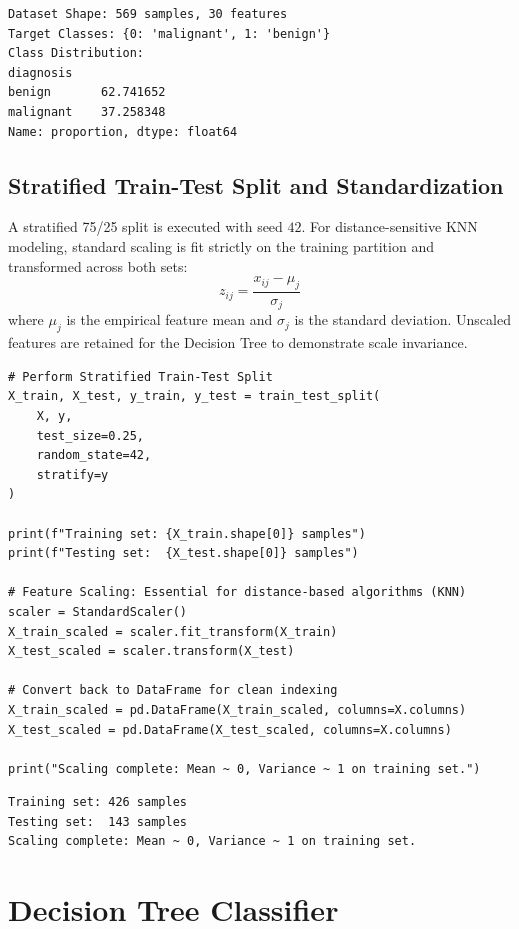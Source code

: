\documentclass[12pt]{article}
\begin{document}
\begin{lstlisting}[style=output]
Dataset Shape: 569 samples, 30 features
Target Classes: {0: 'malignant', 1: 'benign'}
Class Distribution:
diagnosis
benign       62.741652
malignant    37.258348
Name: proportion, dtype: float64
\end{lstlisting}

\subsection{Stratified Train-Test Split and Standardization}
A stratified 75/25 split is executed with seed $42$. For distance-sensitive KNN modeling, standard scaling is fit strictly on the training partition and transformed across both sets:
\begin{equation}
    z_{ij} = \frac{x_{ij} - \mu_j}{\sigma_j}
\end{equation}
where $\mu_j$ is the empirical feature mean and $\sigma_j$ is the standard deviation. Unscaled features are retained for the Decision Tree to demonstrate scale invariance.

\begin{lstlisting}[style=code]
# Perform Stratified Train-Test Split
X_train, X_test, y_train, y_test = train_test_split(
    X, y,
    test_size=0.25,
    random_state=42,
    stratify=y
)

print(f"Training set: {X_train.shape[0]} samples")
print(f"Testing set:  {X_test.shape[0]} samples")

# Feature Scaling: Essential for distance-based algorithms (KNN)
scaler = StandardScaler()
X_train_scaled = scaler.fit_transform(X_train)
X_test_scaled = scaler.transform(X_test)

# Convert back to DataFrame for clean indexing
X_train_scaled = pd.DataFrame(X_train_scaled, columns=X.columns)
X_test_scaled = pd.DataFrame(X_test_scaled, columns=X.columns)

print("Scaling complete: Mean ~ 0, Variance ~ 1 on training set.")
\end{lstlisting}

\begin{lstlisting}[style=output]
Training set: 426 samples
Testing set:  143 samples
Scaling complete: Mean ~ 0, Variance ~ 1 on training set.
\end{lstlisting}

\newpage
\section{Decision Tree Classifier}
\end{document}
